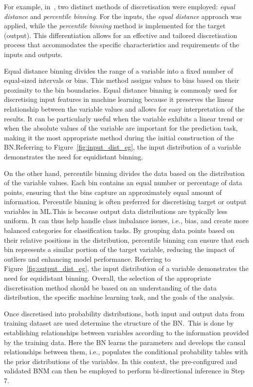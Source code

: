 \documentclass[journal]{IEEEtran}
\begin{document}
For example, in~\cite{Griffiths2024}, two distinct methods of discretisation were employed: \textit{equal distance} and \textit{percentile binning}. For the inputs, the \textit{equal distance} approach was applied, while the \textit{percentile binning} method is implemented for the target (output). This differentiation allows for an effective and tailored discretisation process that accommodates the specific characteristics and requirements of the inputs and outputs.

Equal distance binning divides the range of a variable into a fixed number of equal-sized intervals or bins\@. This method assigns values to bins based on their proximity to the bin boundaries. Equal distance binning is commonly used for discretising input features in machine learning because it preserves the linear relationship between the variable values and allows for easy interpretation of the results. It can be particularly useful when the variable exhibits a linear trend or when the absolute values of the variable are important for the prediction task, making it the most appropriate method during the initial construction of the BN.\@ Referring to Figure~\ref{fig:input_dist_eg}, the input distribution of a variable demonstrates the need for equidistant binning.

On the other hand, percentile binning divides the data based on the distribution of the variable values. Each bin contains an equal number or percentage of data points, ensuring that the bins capture an approximately equal amount of information. Percentile binning is often preferred for discretising target or output variables in ML.\@ This is because output data distributions are typically less uniform. It can thus help handle class imbalance issues, i.e., bias, and create more balanced categories for classification tasks. By grouping data points based on their relative positions in the distribution, percentile binning can ensure that each bin represents a similar portion of the target variable, reducing the impact of outliers and enhancing model performance. Referring to Figure~\ref{fig:output_dist_eg}, the input distribution of a variable demonstrates the need for equidistant binning.  Overall, the selection of the appropriate discretisation method should be based on an understanding of the data distribution, the specific machine learning task, and the goals of the analysis. 

Once discretised into probability distributions, both input and output data from training dataset are used determine the structure of the BN.~This is done by establishing relationships between variables according to the information provided by the training data. Here the BN learns the parameters and develops the causal relationships between them, i.e., populates the conditional probability tables with the prior distributions of the variables. In this context, the pre-configured and validated BNM can then be employed to perform bi-directional inference in Step 7.
\end{document}
